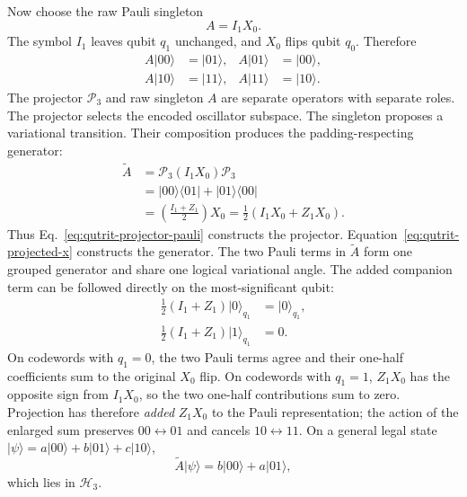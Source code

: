 \documentclass[10pt,twocolumn]{article}
\newcommand{\ket}[1]{\lvert #1\rangle}
\newcommand{\bra}[1]{\langle #1\rvert}
\begin{document}
Now choose the raw Pauli singleton
\begin{equation*}
A=I_1X_0.
\end{equation*}
The symbol \(I_1\) leaves qubit \(q_1\) unchanged, and \(X_0\) flips qubit
\(q_0\). Therefore
\begin{align*}
A\ket{00}&=\ket{01},& A\ket{01}&=\ket{00},\\
A\ket{10}&=\ket{11},& A\ket{11}&=\ket{10}.
\end{align*}
The projector \(\mathcal P_3\) and raw singleton \(A\) are separate operators
with separate roles. The projector selects the encoded oscillator subspace.
The singleton proposes a variational transition. Their composition produces
the padding-respecting generator:
\begin{align}
\widetilde A
&=\mathcal P_3(I_1X_0)\mathcal P_3\nonumber\\
&=\ket{00}\bra{01}+\ket{01}\bra{00}\nonumber\\
&=\left(\frac{I_1+Z_1}{2}\right)X_0
=\frac12(I_1X_0+Z_1X_0).
\label{eq:qutrit-projected-x}
\end{align}
Thus Eq.~\eqref{eq:qutrit-projector-pauli} constructs the projector.
Equation~\eqref{eq:qutrit-projected-x} constructs the generator. The two Pauli
terms in \(\widetilde A\) form one grouped generator and share one logical
variational angle.
The added companion term can be followed directly on the most-significant
qubit:
\begin{align}
\frac12(I_1+Z_1)\ket{0}_{q_1}
&=\ket{0}_{q_1},\nonumber\\
\frac12(I_1+Z_1)\ket{1}_{q_1}
&=0.
\label{eq:qutrit-companion-action}
\end{align}
On codewords with \(q_1=0\), the two Pauli terms agree and their
one-half coefficients sum to the original \(X_0\) flip. On codewords with
\(q_1=1\), \(Z_1X_0\) has the opposite sign from \(I_1X_0\), so the two
one-half contributions sum to zero. Projection has therefore \emph{added}
\(Z_1X_0\) to the Pauli representation; the action of the enlarged sum
preserves \(00\leftrightarrow01\) and cancels
\(10\leftrightarrow11\).
On a general legal state
\(\ket\psi=a\ket{00}+b\ket{01}+c\ket{10}\),
\begin{equation}
\widetilde A\ket\psi=b\ket{00}+a\ket{01},
\label{eq:qutrit-action}
\end{equation}
which lies in \(\mathcal H_3\).

\begin{center}
\end{center}
\end{document}
